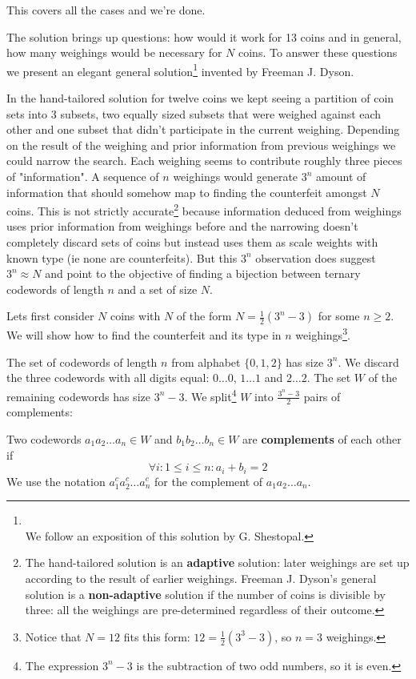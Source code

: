 \noindent This covers all the cases and we're done.

The solution brings up questions: how would it work for 13 coins and in general, how many weighings would be necessary for $N$ coins. To answer these questions we present an elegant general solution\footnote{ \\ We follow an exposition of this solution by G. Shestopal.} invented by Freeman J. Dyson.

In the hand-tailored solution for twelve coins we kept seeing a partition of coin sets into 3 subsets, two equally sized subsets that were weighed against each other and one subset that didn't participate in the current weighing. Depending on the result of the weighing and prior information from previous weighings we could narrow the search. Each weighing seems to contribute roughly three pieces of "information". A sequence of $n$ weighings would generate $3^n$ amount of information that should somehow map to finding the counterfeit amongst $N$ coins. This is not strictly accurate\footnote{The hand-tailored solution is an \textbf{adaptive} solution: later weighings are set up according to the result of earlier weighings. Freeman J. Dyson's general solution is a \textbf{non-adaptive} solution if the number of coins is divisible by three: all the weighings are pre-determined regardless of their outcome.} because information deduced from weighings uses prior information from weighings before and the narrowing doesn't completely discard sets of coins but instead uses them as scale weights with known type (ie none are counterfeits). But this $3^n$ observation does suggest $3^n \approx N$ and point to the objective of finding a bijection between ternary codewords of length $n$ and a set of size $N$. 

Lets first consider $N$ coins with $N$ of the form $N = \frac{1}{2} (3^n - 3)$ for some $n \geq 2$. We will show how to find the counterfeit and its type in $n$ weighings\footnote{Notice that $N=12$ fits this form: $12 = \frac{1}{2} (3^3 - 3)$, so $n=3$ weighings.}.

The set of codewords of length $n$ from alphabet $\{0, 1, 2\}$ has size $3^n$. We discard the three codewords with all digits equal: $0\ldots0$, $1\ldots1$ and $2\ldots2$. The set $W$ of the remaining codewords has size $3^n - 3$. We split\footnote{The expression $3^n - 3$ is the subtraction of two odd numbers, so it is even.} $W$ into $\frac{3^n - 3}{2}$ pairs of complements: 

\begin{defn}
Two codewords $a_1 a_2 \ldots a_n \in W$ and $b_1 b_2 \ldots b_n \in W$ are \textbf{complements} of each other if 
$$
\forall i: 1 \leq i \leq n: a_i + b_i = 2
$$
We use the notation $a_1^c a_2^c \ldots a_n^c$ for the complement of $a_1 a_2 \ldots a_n$.
\end{defn}

